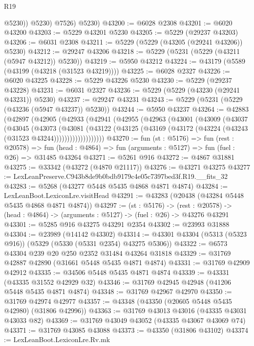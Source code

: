\begin{lexlean}{R19}
\begin{coremodule}
              @5230))
          @5230)
        @7526)
      @5230)
@43200 := @6028 @2308
@43201 := @6020 @43200
@43203 := @5229 @43201 @5230
@43205 := @5229 (@29237 @43203)
@43206 := @6031 @2308
@43211 := @5229 (@5229 (@43205 (@29241 @43206)) @5230)
@43212 := @29247 @43206
@43218 := @5229 (@5231 (@5229 (@43211 (@5947 @43212)) @5230))
@43219 := @5950 @43212
@43224 := @43179 (@5589 (@43199 (@43218 (@31523 @43219))))
@43225 := @6028 @2327
@43226 := @6020 @43225
@43228 := @5229 @43226 @5230
@43230 := @5229 (@29237 @43228)
@43231 := @6031 @2327
@43236 := @5229 (@5229 (@43230 (@29241 @43231)) @5230)
@43237 := @29247 @43231
@43243 := @5229 (@5231 (@5229 (@43236 (@5947 @43237)) @5230))
@43244 := @5950 @43237
@43264 := @42883
    (@42897
      (@42905
        (@42933
          (@42941
            (@42955
              (@42963
                (@43001
                  (@43009
                    (@43037
                      (@43045
                        (@43073
                          (@43081
                            (@43122
                              (@43125
                                (@43169 (@43172 (@43224 (@43243 (@31523 @43244)))))))))))))))))))
@43270 := fun (st : @5176) =>
  fun (rest : @20578) =>
  fun (head : @4864) => fun (arguments : @5127) => fun (fuel : @26) => @31485 @43264
@43271 := @5261 @916
@43272 := @4867 @31881
@43275 := @33342 (@43272 (@4870 @21117))
@43276 := @43271 @43275
@43277 := LexLeanPreserve.C943b8de9b0bdb9179c4e05c7397bed3f.R19.__fits_32
@43283 := @5268 (@43277 @5448 @5435 @4868 @4871 @4874)
@43284 := LexLeanBoot.LexiconLre.visitHead
@43291 := @43283 (@20438 (@43284 @5448 @5435 @4868 @4871 @4874))
@43297 := (st : @5176) ->
  (rest : @20578) -> (head : @4864) -> (arguments : @5127) -> (fuel : @26) -> @43276 @43291
@43301 := @5285 @916 @43275 @43291 @2354
@43302 := @23993 @31888
@43304 := @23989 (@14142 @43302)
@43314 := @43301 @43304 (@5313 (@5323 @916)) (@5329 (@5330 (@5331 @2354) @43275 @5306))
@43322 := @6573 @43304 @239 @20 @250 @2352 @31484 @43264 @31818
@43329 := @31769 @42887 @42890 (@31661 @5448 @5435 @4871 @4874)
@43331 := @31769 @42909 @42912
@43335 := @34506 @5448 @5435 @4871 @4874
@43339 := @43331 (@43335 @31552 @42929 @32)
@43346 := @31769 @42945 @42948 (@41206 @5448 @5435 @4871 @4874)
@43348 := @31769 @42967 @42970
@43350 := @31769 @42974 @42977
@43357 := @43348 (@43350 (@20605 @5448 @5435 @42980) (@31806 @42996))
@43363 := @31769 @43013 @43016 (@43335 @43031 @43033 @82)
@43369 := @31769 @43049 @43052 (@43335 @43067 @43069 @74)
@43371 := @31769 @43085 @43088
@43373 := @43350 (@31806 @43102)
@43374 := LexLeanBoot.LexiconLre.Rv.mk

\end{coremodule}
\end{lexlean}
